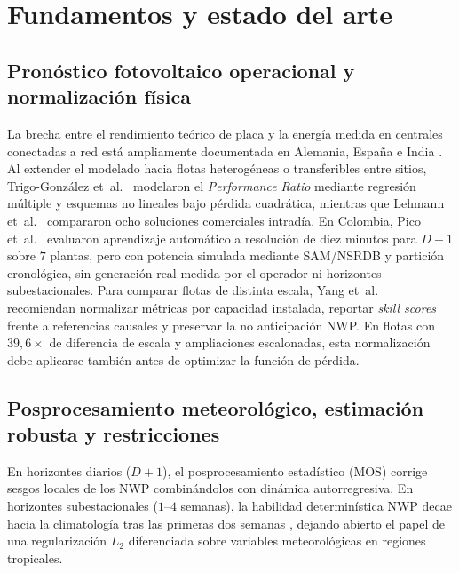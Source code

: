 \section{Fundamentos y estado del arte}\label{sec:estado}

\subsection{Pronóstico fotovoltaico operacional y normalización física}

La brecha entre el rendimiento teórico de placa y la energía medida en centrales conectadas a red está ampliamente documentada en Alemania, España e India \cite{mueller2016yield,purohit2018performance}. Al extender el modelado hacia flotas heterogéneas o transferibles entre sitios, Trigo-González et~al.~\cite{trigo2019hourly,trigo2021models} modelaron el \textit{Performance Ratio} mediante regresión múltiple y esquemas no lineales bajo pérdida cuadrática, mientras que Lehmann et~al.~\cite{lehmann2023benchmark} compararon ocho soluciones comerciales intradía. En Colombia, Pico et~al.~\cite{pico2026shortterm} evaluaron aprendizaje automático a resolución de diez minutos para $D+1$ sobre $7$ plantas, pero con potencia simulada mediante SAM/NSRDB y partición cronológica, sin generación real medida por el operador ni horizontes subestacionales. Para comparar flotas de distinta escala, Yang et~al.~\cite{yang2020} recomiendan normalizar métricas por capacidad instalada, reportar \textit{skill scores} frente a referencias causales y preservar la no anticipación NWP. En flotas con $39{,}6\times$ de diferencia de escala y ampliaciones escalonadas, esta normalización debe aplicarse también antes de optimizar la función de pérdida.

\subsection{Posprocesamiento meteorológico, estimación robusta y restricciones}

En horizontes diarios ($D+1$), el posprocesamiento estadístico (MOS) \cite{glahn1972mos,bacher2009online,yang2021postprocessing} corrige sesgos locales de los NWP combinándolos con dinámica autorregresiva. En horizontes subestacionales ($1$--$4$ semanas), la habilidad determinística NWP decae hacia la climatología tras las primeras dos semanas \cite{bloomfield2021}, dejando abierto el papel de una regularización $L_2$ diferenciada sobre variables meteorológicas en regiones tropicales.

